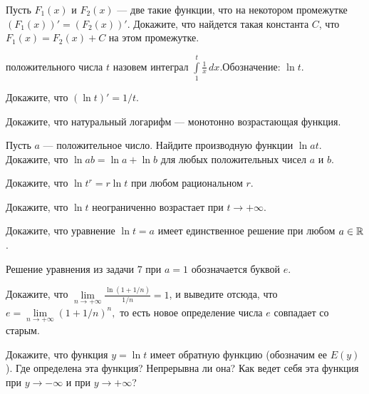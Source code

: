 \documentclass[a4paper, 12pt]{article}
\begin{document}


\smallskip

Пусть $F_1(x)$ и $F_2(x)$ --- две такие функции, что на некотором промежутке
$(F_1(x))'=(F_2(x))'$. Докажите, что найдется такая
константа $C$, что $F_1(x)=F_2(x)+C$ на этом промежутке.


 положительного числа $t$ назовем
интеграл $\int\limits_1^t\frac1x\,dx$.\break Обозначение: $\ln t$.

Докажите, что $(\ln t)'=1/t$.

Докажите, что натуральный логарифм --- монотонно возрастающая функция.

Пусть $a$ --- положительное число. Найдите производную
функции $\ln at$.\\
Докажите, что $\ln ab=\ln a+\ln b$ для любых положительных чисел $a$ и $b$.

Докажите, что
$\ln t^r=r\ln t$ при любом рациональном $r$.

Докажите, что $\ln t$ неограниченно возрастает при $t\rightarrow+\infty$.

Докажите, что уравнение $\ln t=a$ имеет единственное %
решение при любом  $a\in\mathbb{R}$.

Решение уравнения из задачи 7 при $a=1$ обозначается буквой $e$.

Докажите, что
$\displaystyle\lim\limits_{n\rightarrow+\infty}\frac{\ln
(1+1/n)}{1/n}=1$, и выведите отсюда, что
$e=\lim\limits_{n\rightarrow+\infty}\left(1+1/n\right)^{n},$\break
то есть новое определение числа $e$ совпадает со старым.

Докажите, что функция $y=\ln t$ имеет обратную функцию
(обозначим ее $E(y)$). Где определена эта функция?
Непрерывна ли она?
Как ведет себя эта функция при $y\rightarrow-\infty$ и
при $y\rightarrow+\infty$?
\end{document}
